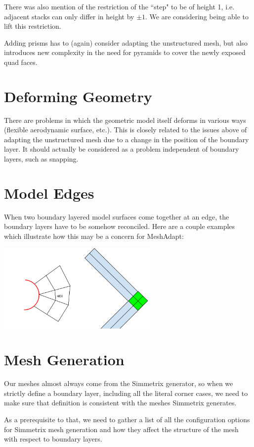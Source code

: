 \documentclass{article}
\begin{document}
There was also mention of the restriction of the ``step"
to be of height 1, i.e. adjacent stacks can only differ in
height by $\pm 1$.
We are considering being able to lift this restriction.

Adding prisms has to (again) consider adapting the unstructured mesh,
but also introduces new complexity in the need for pyramids to
cover the newly exposed quad faces.

\section{Deforming Geometry}

There are problems in which the geometric model itself deforms in various
ways (flexible aerodynamic surface, etc.).
This is closely related to the issues above of adapting the unstructured
mesh due to a change in the position of the boundary layer.
It should actually be considered as a problem independent of boundary layers,
such as snapping.

\section{Model Edges}

When two boundary layered model surfaces come together at an edge,
the boundary layers have to be somehow reconciled.
Here are a couple examples which illustrate how this may be a concern
for MeshAdapt:

\includegraphics[width=0.6\textwidth]{layer_blend.png}

\section{Mesh Generation}

Our meshes almost always come from the Simmetrix generator, so when
we strictly define a boundary layer, including all the literal
corner cases, we need to make sure that definition is consistent
with the meshes Simmetrix generates.

As a prerequisite to that, we need to gather a list of all the configuration
options for Simmetrix mesh generation and how they affect the structure
of the mesh with respect to boundary layers.
\end{document}
